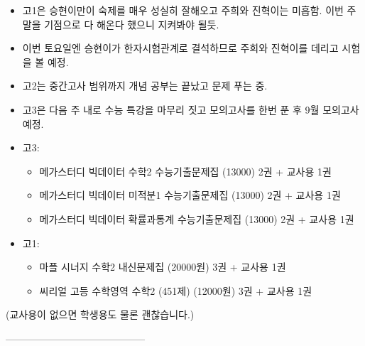 \documentclass[idxtotoc,hyperref,openany]{labbook} %
\begin{document}

\begin{itemize}
	\item 고1은 승현이만이 숙제를 매우 성실히 잘해오고 주희와 진혁이는 미흡함. 이번 주말을 기점으로 다 해온다 했으니 지켜봐야 될듯.
	\item 이번 토요일엔 승현이가 한자시험관계로 결석하므로 주희와 진혁이를 데리고 시험을 볼 예정.
	\item 고2는 중간고사 범위까지 개념 공부는 끝났고 문제 푸는 중.
	\item 고3은 다음 주 내로 수능 특강을 마무리 짓고 모의고사를 한번 푼 후 9월 모의고사 예정.
\end{itemize}



\begin{itemize}
 \item 고3: 
 \begin{itemize}
  \item 메가스터디 빅데이터 수학2 수능기출문제집 (13000) 2권 + 교사용 1권
  \item 메가스터디 빅데이터 미적분1 수능기출문제집 (13000) 2권 + 교사용 1권
  \item 메가스터디 빅데이터 확률과통계 수능기출문제집 (13000) 2권 + 교사용 1권
 \end{itemize}
 \item 고1:
 \begin{itemize}
  \item 마플 시너지 수학2 내신문제집 (20000원) 3권 + 교사용 1권
  \item 씨리얼 고등 수학영역 수학2 (451제) (12000원) 3권 + 교사용 1권
 \end{itemize}
\end{itemize}
(교사용이 없으면 학생용도 물론 괜찮습니다.) 


------------------------------------------










\end{document}
